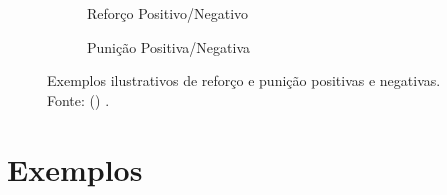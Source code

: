 \documentclass{article}
\begin{document}
                \begin{figure}[ht]
                    \centering
                    \begin{subfigure}[b]{.45\textwidth}
                        \centering
                        \caption{Reforço Positivo/Negativo}
                    \end{subfigure}
                    \begin{subfigure}[b]{.45\textwidth}
                        \centering
                        \caption{Punição Positiva/Negativa}
                    \end{subfigure}
                    \caption{Exemplos ilustrativos de reforço e punição positivas e negativas. Fonte: \citeauthor{Shrestha2017} (\citeyear{Shrestha2017}) \cite{Shrestha2017}.}
                    \label{fig:reforco-punicao}
                \end{figure}
            
    \section{Exemplos}
    
\end{document}
